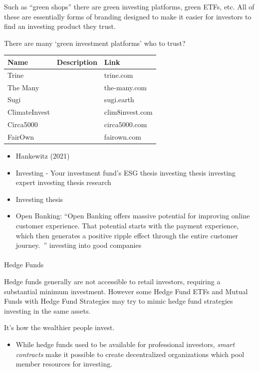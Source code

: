 \documentclass[
  letterpaper,
  DIV=11,
  numbers=noendperiod]{scrartcl}
\makeatletter
\let\oldparagraph\paragraph
\renewcommand{\paragraph}{
    \@ifstar
      \xxxParagraphStar
      \xxxParagraphNoStar
  }
\newcommand{\xxxParagraphStar}[1]{\oldparagraph*{#1}\mbox{}}
\newcommand{\xxxParagraphNoStar}[1]{\oldparagraph{#1}\mbox{}}
\providecommand{\tightlist}{%
  \setlength{\itemsep}{0pt}\setlength{\parskip}{0pt}}\usepackage{longtable,booktabs,array}
\makeatother
\begin{document}
Such as ``green shops'' there are green investing platforms, green ETFs,
etc. All of these are essentially forms of branding designed to make it
easier for investors to find an investing product they trust.

There are many `green investment platforms' who to trust?

\begin{longtable}[]{@{}lll@{}}
\toprule\noalign{}
Name & Description & Link \\
\midrule\noalign{}
\endhead
\bottomrule\noalign{}
\endlastfoot
Trine & & trine.com \\
The Many & & the-many.com \\
Sugi & & sugi.earth \\
ClimateInvest & & clim8invest.com \\
Circa5000 & & circa5000.com \\
FairOwn & & fairown.com \\
\end{longtable}

\begin{itemize}
\item
  Hankewitz (2021)
\item
  Investing - Your investment fund's ESG thesis investing thesis
  investing expert investing thesis research
\item
  Investing thesis
\item
  Open Banking: ``Open Banking offers massive potential for improving
  online customer experience. That potential starts with the payment
  experience, which then generates a positive ripple effect through the
  entire customer journey.~'' investing into good companies
\end{itemize}

\paragraph{Hedge Funds}\label{hedge-funds}

Hedge funds generally are not accessible to retail investors, requiring
a substantial minimum investment. However some Hedge Fund ETFs and
Mutual Funds with Hedge Fund Strategies may try to mimic hedge fund
strategies investing in the same assets.

It's how the wealthier people invest.

\begin{itemize}
\tightlist
\item
  While hedge funds used to be available for professional investors,
  \emph{smart contracts} make it possible to create decentralized
  organizations which pool member resources for investing.
\end{itemize}
\end{document}
